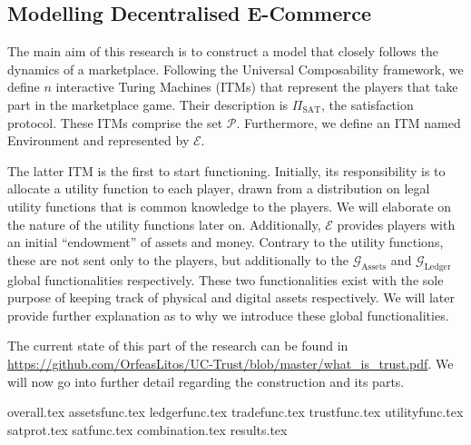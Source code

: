 \subsection{Modelling Decentralised E-Commerce}
  The main aim of this research is to construct a model that closely follows the dynamics
  of a marketplace. Following the Universal Composability framework, we define $n$
  interactive Turing Machines (ITMs) that represent the players that take part in the
  marketplace game. Their description is $\Pi_{\mathrm{SAT}}$, the satisfaction protocol.
  These ITMs comprise the set $\mathcal{P}$. Furthermore, we define an ITM named
  Environment and represented by $\mathcal{E}$.

  The latter ITM is the first to start functioning. Initially, its responsibility is to
  allocate a utility function to each player, drawn from a distribution on legal utility
  functions that is common knowledge \cite{knowledge} to the players. We will elaborate on
  the nature of the utility functions later on. Additionally, $\mathcal{E}$ provides
  players with an initial ``endowment'' of assets and money. Contrary to the utility
  functions, these are not sent only to the players, but additionally to the
  $\mathcal{G}_{\mathrm{Assets}}$ and $\mathcal{G}_{\mathrm{Ledger}}$ global
  functionalities respectively. These two functionalities exist with the sole purpose of
  keeping track of physical and digital assets respectively. We will later provide further
  explanation as to why we introduce these global functionalities.

  The current state of this part of the research can be found in
  \url{https://github.com/OrfeasLitos/UC-Trust/blob/master/what_is_trust.pdf}. We will
  now go into further detail regarding the construction and its parts.

  {overall.tex}
  {assetsfunc.tex}
  {ledgerfunc.tex}
  {tradefunc.tex}
  {trustfunc.tex}
  {utilityfunc.tex}
  {satprot.tex}
  {satfunc.tex}
  {combination.tex}
  {results.tex}
